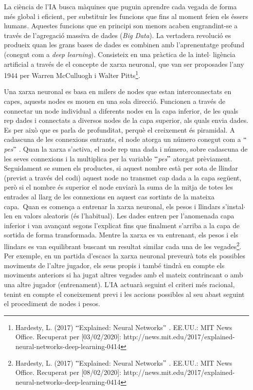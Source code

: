 \documentclass[12pt]{article}
\begin{document}
\vspace{\baselineskip}
\begin{justify}
La ciència de l’IA busca màquines que puguin aprendre cada vegada de forma més global i eficient, per substituir les funcions que fins al moment feien els éssers humans\textit{.} Aquestes funcions que en principi son menors acaben engrandint-se a través de l’agregació massiva de dades (\textit{Big Data}).  La vertadera revolució es produeix quan les grans bases de dades es combinen amb l’aprenentatge profund (conegut com a \textit{deep learning}). Consisteix en una pràctica de la intel$ \cdot $ ligència artificial a través de el concepte de xarxa neuronal, que van ser proposades l’any 1944 per Warren McCulluogh i Walter Pitts\footnote{ Hardesty, L. (2017) $``$Explained: Neural Networks$"$ . EE.UU.: MIT News Office. Recuperat per [03/02/2020]: http://news.mit.edu/2017/explained-neural-networks-deep-learning-0414 }. 
\end{justify}\par


\vspace{\baselineskip}
\begin{justify}
Una xarxa neuronal es basa en milers de nodes que estan interconnectats en capes, aquests nodes es mouen en una sola direcció. Funcionen a través de connectar un node individual a diferents nodes en la capa inferior, de les quals rep dades i connectats a diversos nodes de la capa superior, als quals envia dades. Es per això que es parla de profunditat, perquè el creixement és piramidal. A cadascuna de les connexions entrants, el node atorga un número conegut com a $``$\textit{pes}$"$ . Quan la xarxa s’activa, el node rep una dada i número, sobre cadascuna de les seves connexions i la multiplica per la variable $``$\textit{pes}$"$  atorgat prèviament. Seguidament se sumen els productes, si aquest nombre està per sota de llindar (previst a través del codi) aquest node no transmet cap dada a la capa següent, però si el nombre és superior el node enviarà la suma de la mitja de totes les entrades al llarg de les connexions en aquest cas sortints de la mateixa capa.\  Quan es comença a entrenar la xarxa neuronal, els pesos i llindars s’instal$ \cdot $ len en valors aleatoris (és l’habitual). Les dades entren per l’anomenada capa inferior i van avançant segons l’explicat fins que finalment s’arriba a la capa de sortida de forma transformada. Mentre la xarxa es va entrenant, els pesos i els llindars es van equilibrant buscant un resultat similar cada una de les vegades\footnote{ Hardesty, L. (2017) $``$Explained: Neural Networks$"$ . EE.UU.: MIT News Office. Recuperat per [08/02/2020]: http://news.mit.edu/2017/explained-neural-networks-deep-learning-0414 }.  Per exemple, en un partida d’escacs la xarxa neuronal preveurà tots els possibles moviments de l’altre jugador, els seus propis i també tindrà en compte els moviments anteriors si ha jugat altres vegades amb el mateix contrincant o amb una altre jugador (entrenament). L’IA actuarà seguint el criteri més racional, tenint en compte el coneixement previ i les accions possibles al seu abast seguint el procediment de nodes i pesos. 
\end{justify}\par
\end{document}
